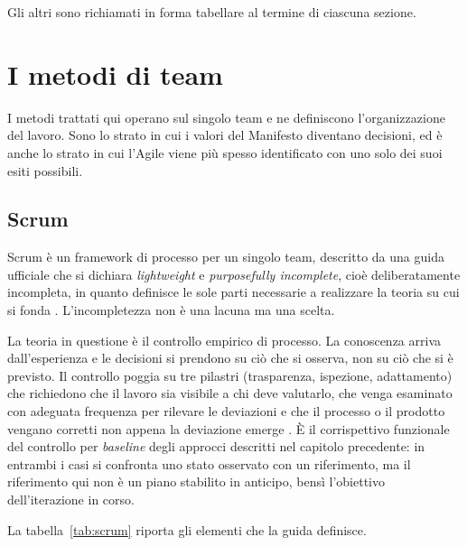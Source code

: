 Gli altri sono richiamati in forma tabellare al termine di ciascuna sezione.

\newpage


\section{I metodi di team}

I metodi trattati qui operano sul singolo team e ne definiscono
l'organizzazione del lavoro. Sono lo strato in cui i valori del Manifesto
diventano decisioni, ed \`e anche lo strato in cui l'Agile viene pi\`u spesso
identificato con uno solo dei suoi esiti possibili.

\subsection{Scrum}

Scrum \`e un framework di processo per un singolo team, descritto da una guida
ufficiale che si dichiara \emph{lightweight} e \emph{purposefully incomplete},
cio\`e deliberatamente incompleta, in quanto definisce le sole parti necessarie
a realizzare la teoria su cui si fonda \cite{scrumguide2020}. L'incompletezza
non \`e una lacuna ma una scelta.

La teoria in questione \`e il controllo empirico di processo. La conoscenza
arriva dall'esperienza e le decisioni si prendono su ci\`o che si osserva, non
su ci\`o che si \`e previsto. Il controllo poggia su tre pilastri (trasparenza,
ispezione, adattamento) che richiedono che il
lavoro sia visibile a chi deve valutarlo, che venga esaminato con adeguata
frequenza per rilevare le deviazioni e che il processo o il prodotto vengano
corretti non appena la deviazione emerge \cite{scrumguide2020}. \`E il
corrispettivo funzionale del controllo per \emph{baseline} degli approcci
descritti nel capitolo precedente: in entrambi i casi si confronta uno stato
osservato con un riferimento, ma il riferimento qui non \`e un piano stabilito
in anticipo, bens\`i l'obiettivo dell'iterazione in corso.

La tabella~\ref{tab:scrum} riporta gli elementi che la guida definisce.


